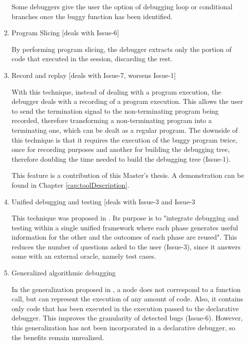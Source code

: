 \begin{enumerate}
Some debuggers give the user the option of debugging loop or conditional branches once the buggy function has been identified.
\item Program Slicing [deals with Issue-6]

By performing program slicing, the debugger extracts only the portion of code that executed in the session, discarding the rest.
\item Record and replay [deals with Issue-7, worsens Issue-1]

With this technique, instead of dealing with a program execution, the debugger deals with a recording of a program execution. This allows the user to send the termination signal to the non-terminating program being recorded, therefore transforming a non-terminating program into a terminating one, which can be dealt as a regular program. 
The downside of this technique is that it requires the execution of the buggy program twice, once for recording purposes and another for building the debugging tree, therefore doubling the time needed to build the debugging tree (Issue-1).

This feature is a contribution of this Master's thesis. A demonstration can be found in Chapter \ref{cap:toolDescription}.
\item Unified debugging and testing [deals with Issue-3 and Issue-3

This technique was proposed in \cite{unifiedFrameworkDeclarativeDebuggingTesting}. Its purpose is to "integrate debugging and testing within a single unified framework where each phase generates useful information for the other and the outcomes of each phase are reused".
This reduces the number of questions asked to the user (Issue-3), since it answers some with an external oracle, namely test cases.
\item Generalized algorithmic debugging

In the generalization proposed in \cite{AlgorithmicDebuggingGeneralized}, a node does not correspond to a function call, but can represent the execution of any amount of code. Also, it contains only code that has been executed in the execution passed to the declarative debugger. This improves the granularity of detected bugs (Issue-6).
However, this generalization has not been incorporated in a declarative debugger, so the benefits remain unrealized.
\end{enumerate}
